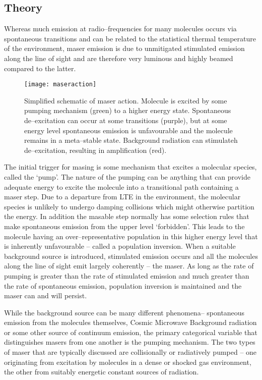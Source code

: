 		\subsection{Theory}
			Whereas much emission at radio--frequencies for many molecules occurs via spontaneous transitions and can be related to the statistical thermal temperature of the environment, maser emission is due to unmitigated stimulated emission along the line of sight and are therefore very luminous and highly beamed compared to the latter.
			\begin{SCfigure}
				\centering
				\texttt{[image: maseraction]}
				\caption[Masering]{Simplified schematic of maser action. Molecule is excited by some pumping mechanism (green) to a higher energy state. Spontaneous de--excitation can occur at some transitions (purple), but at some energy level spontaneous emission is unfavourable and the molecule remains in a meta--stable state. Background radiation can stimulateh de--excitation, resulting in amplification (red).}
				\label{fig:intro_maseraction}
			\end{SCfigure}
			The initial trigger for masing is some mechanism that excites a molecular species, called the `pump'. The nature of the pumping can be anything that can provide adequate energy to excite the molecule into a transitional path containing a maser step. Due to a departure from LTE in the environment, the molecular species is unlikely to undergo damping collisions which might otherwise partition the energy. In addition the masable step normally has some selection rules that make spontaneous emission from the upper level `forbidden'. This leads to the molecule having an over--representative population in this higher energy level that is inherently unfavourable -- called a population inversion. When a suitable background source is introduced, stimulated emission occurs and all the molecules along the line of sight emit largely coherently -- the maser. As long as the rate of pumping is greater than the rate of stimulated emission and much greater than the rate of spontaneous emission, population inversion is maintained and the maser can and will persist.
			
			While the background source can be many different phenomena-- spontaneous emission from the molecules themselves, Cosmic Microwave Background radiation or some other source of continuum emission, the primary categorical variable that distinguishes masers from one another is the pumping mechanism. The two types of maser that are typically discussed are collisionally or radiatively pumped -- one originating from excitation by molecules in a dense or shocked gas environment, the other from suitably energetic constant sources of radiation.   
			
